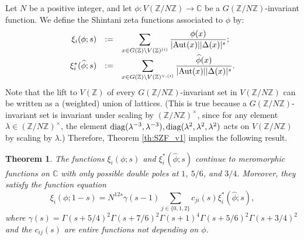 \documentclass{article}
\def\Z{{\mathbb Z}}
\def\Aut{{\rm Aut}}
\def\diag{{\rm diag}}
\def\Z{{\mathbb Z}}
\def\C{{\mathbb C}}
\newtheorem{theorem}{Theorem}[section]
\begin{document}
Let $N$ be a positive integer, and let $\phi:V(\Z/N\Z)\to \C$ be a $G(\Z/N\Z)$-invariant function. We define the Shintani zeta functions associated to $\phi$ by:
\begin{equation*}
\begin{array}{rcl}
\xi_{i}(\phi;s)&:=&\displaystyle\sum_{x\in G(\Z)\backslash V(\Z)^{(i)}}\frac{\phi(x)}{|\Aut(x)||\Delta(x)|^{s}};
\\[.15in]
\xi_i^{*}(\widehat{\phi};s)&:=&\displaystyle\sum_{x\in G(\Z)\backslash V(\Z)^{\vee,(i)}}\frac{\widehat{\phi}(x)}{|\Aut(x)||\Delta(x)|^{s}}.
\end{array}
\end{equation*}
Note that the lift to $V(\Z)$ of every $G(\Z/N\Z)$-invariant set in $V(\Z/N\Z)$ can be written as a (weighted) union of lattices. (This is true because a $G(\Z/N\Z)$-invariant set is invariant under scaling by $(\Z/N\Z)^\times$, since for any element $\lambda\in (\Z/N\Z)^\times$, the element $\diag(\lambda^{-3},\lambda^{-3}),\diag(\lambda^2,\lambda^2,\lambda^2)$ acts on $V(\Z/N\Z)$ by scaling by $\lambda$.) Therefore, Theorem \ref{th:SZF_v1} implies the following result.
\begin{theorem}\label{th:SZF_v2}
The functions $\xi_i(\phi;s)$ and $\xi_i^{*}(\widehat{\phi};s)$ continue to meromorphic functions on $\C$ with only possible double poles at $1$, $5/6$, and $3/4$. Moreover, they satisfy the function equation
\begin{equation*}
\xi_i(\phi;1-s)=N^{12s}\gamma(s-1)\sum_{j\in\{0,1,2\}}c_{ji}(s)\xi^*_i(\widehat{\phi};s),
\end{equation*}
where $\gamma(s)=\Gamma(s+5/4)^2\Gamma(s+7/6)^2\Gamma(s+1)^4\Gamma(s+5/6)^2\Gamma(s+3/4)^2$ and the $c_{ij}(s)$ are entire functions not depending on $\phi$.
\end{theorem}
\end{document}
